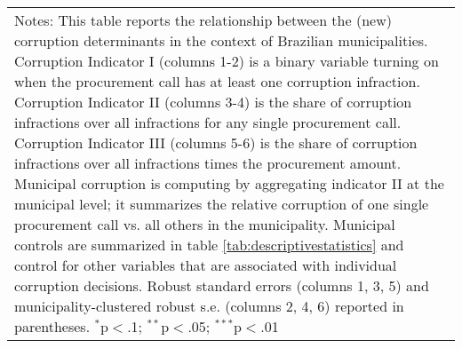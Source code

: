 \documentclass[11pt]{article}
\newcommand\T{\rule{0pt}{2.6ex}}       %
\begin{document}
\begin{table}[!htbp]
\begin{tabular}{l@{\extracolsep{4pt}}ccccc@{\extracolsep{4pt}}c}
  \hline
  \multicolumn{7}{p{.93\textwidth}}{\footnotesize{Notes: This table reports the relationship between the (new) corruption determinants in the context of Brazilian municipalities. Corruption Indicator I (columns 1-2) is a binary variable turning on when the procurement call has at least one corruption infraction. Corruption Indicator II (columns 3-4) is the share of corruption infractions over all infractions for any single procurement call. Corruption Indicator III (columns 5-6) is the share of corruption infractions over all infractions times the procurement amount. Municipal corruption is computing by aggregating indicator II at the municipal level; it summarizes the relative corruption of one single procurement call vs. all others in the municipality. Municipal controls are summarized in table \ref{tab:descriptivestatistics} and control for other variables that are associated with individual corruption decisions. Robust standard errors (columns 1, 3, 5) and municipality-clustered robust s.e. (columns 2, 4, 6) reported in parentheses. $^{*}$p$<$.1; $^{**}$p$<$.05; $^{***}$p$<$.01}} \T
  \end{tabular}
\end{table}
\end{document}
